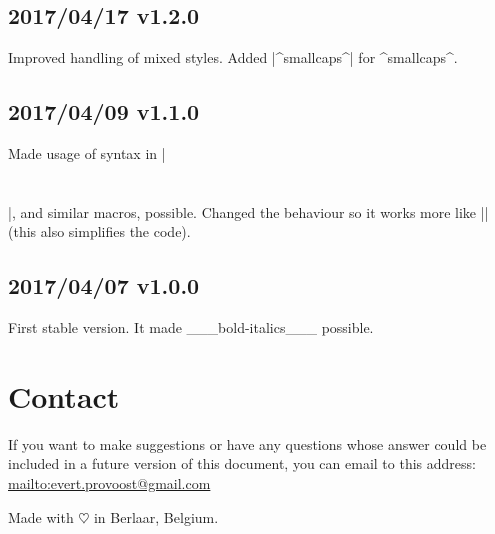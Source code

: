\documentclass[11pt, cm-default]{l3doc}
\begin{document}
	\subsection*{2017/04/17 v1.2.0}
	Improved handling of mixed styles.
	Added |^smallcaps^| for ^smallcaps^.

	\subsection*{2017/04/09 v1.1.0}
	Made usage of syntax in |\section{}|, and similar macros, possible. Changed the behaviour so it works more like |\emph{}| (this also simplifies the code).

	\subsection*{2017/04/07 v1.0.0}
	First stable version. It made ___bold-italics___ possible.


	\section{Contact\label{contact}}
	If you want to make suggestions or have any questions whose answer could be included in a future version of this document, you can email to this address: \url{mailto:evert.provoost@gmail.com}

	\vspace*{\fill}\noindent
	Made with $\heartsuit$ in Berlaar, Belgium.
	\clearpage
\end{document}
